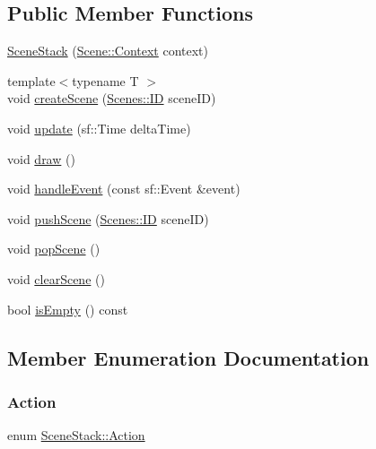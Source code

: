 \subsection*{Public Member Functions}
\begin{DoxyCompactItemize}
\item 
\hyperlink{class_scene_stack_a7893580d1266ed06c9c690012137f799}{Scene\+Stack} (\hyperlink{struct_scene_1_1_context}{Scene\+::\+Context} context)
\item 
{\footnotesize template$<$typename T $>$ }\\void \hyperlink{class_scene_stack_a129b49c7bc280aeaf7c71235b3d9648d}{create\+Scene} (\hyperlink{namespace_scenes_a0ad7ab6856b1d77d498e3a251f6bb275}{Scenes\+::\+ID} scene\+ID)
\item 
void \hyperlink{class_scene_stack_acdea2588bbc85c2834608ebab6671866}{update} (sf\+::\+Time delta\+Time)
\item 
void \hyperlink{class_scene_stack_ab4a68b2247289ba1d934067aad35159d}{draw} ()
\item 
void \hyperlink{class_scene_stack_aecf75add55f527c31528043f4b28db44}{handle\+Event} (const sf\+::\+Event \&event)
\item 
void \hyperlink{class_scene_stack_a41366819a998558e3920fe7859d1f114}{push\+Scene} (\hyperlink{namespace_scenes_a0ad7ab6856b1d77d498e3a251f6bb275}{Scenes\+::\+ID} scene\+ID)
\item 
void \hyperlink{class_scene_stack_a0ea3309f9ec9120cf51a0bce3881e1e2}{pop\+Scene} ()
\item 
void \hyperlink{class_scene_stack_a70253c72c07f5d5c5d77861d064b8470}{clear\+Scene} ()
\item 
bool \hyperlink{class_scene_stack_ade95cce69229a18d169f63093289e865}{is\+Empty} () const
\end{DoxyCompactItemize}


\subsection{Member Enumeration Documentation}
\mbox{\label{class_scene_stack_ab8644e038aad992c6776dc3fb5fcc1f9}} 
\subsubsection{\texorpdfstring{Action}{Action}}
{\footnotesize\ttfamily enum \hyperlink{class_scene_stack_ab8644e038aad992c6776dc3fb5fcc1f9}{Scene\+Stack\+::\+Action}}

